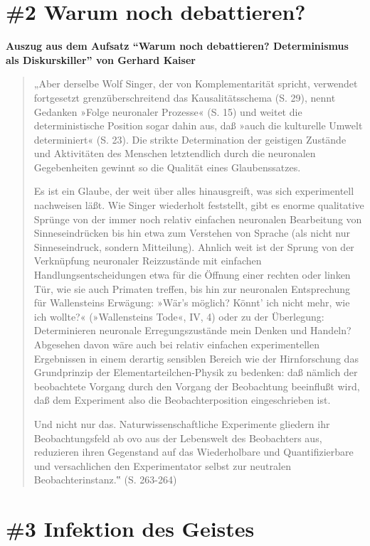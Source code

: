 \documentclass[
  a4paper,
]{report}
\begin{document}
\hypertarget{pr-ev2}{%
\section{\#2 Warum noch debattieren?}\label{pr-ev2}}

\textbf{Auszug aus dem Aufsatz ``Warum noch debattieren? Determinismus als Diskurskiller'' von Gerhard Kaiser \citeyearpar{Kaiser2004}}

\begin{quote}
„Aber derselbe Wolf Singer, der von Komplementarität spricht, verwendet fortgesetzt grenzüberschreitend das Kausalitätsschema (S. 29), nennt Gedanken »Folge neuronaler Prozesse« (S. 15) und weitet die deterministische Position sogar dahin aus, daß »auch die kulturelle Umwelt determiniert« (S. 23). Die strikte Determination der geistigen Zustände und Aktivitäten des Menschen letztendlich durch die neuronalen Gegebenheiten gewinnt so die Qualität eines Glaubenssatzes.

Es ist ein Glaube, der weit über alles hinausgreift, was sich experimentell nachweisen läßt. Wie Singer wiederholt feststellt, gibt es enorme qualitative Sprünge von der immer noch relativ einfachen neuronalen Bearbeitung von Sinneseindrücken bis hin etwa zum Verstehen von Sprache (als nicht nur Sinneseindruck, sondern Mitteilung). Ahnlich weit ist der Sprung von der Verknüpfung neuronaler Reizzustände mit einfachen Handlungsentscheidungen etwa für die Öffnung einer rechten oder linken Tür, wie sie auch Primaten treffen, bis hin zur neuronalen Entsprechung für Wallensteins Erwägung: »Wär's möglich? Könnt' ich nicht mehr, wie ich wollte?« (»Wallensteins Tode«, IV, 4) oder zu der Überlegung: Determinieren neuronale Erregungszustände mein Denken und Handeln? Abgesehen davon wäre auch bei relativ einfachen experimentellen Ergebnissen in einem derartig sensiblen Bereich wie der Hirnforschung das Grundprinzip der Elementarteilchen-Physik zu bedenken: daß nämlich der beobachtete Vorgang durch den Vorgang der Beobachtung beeinflußt wird, daß dem Experiment also die Beobachterposition eingeschrieben ist.

Und nicht nur das. Naturwissenschaftliche Experimente gliedern ihr Beobachtungsfeld ab ovo aus der Lebenswelt des Beobachters aus, reduzieren ihren Gegenstand auf das Wiederholbare und Quantifizierbare und versachlichen den Experimentator selbst zur neutralen Beobachterinstanz.‟ (S. 263-264)
\end{quote}

\hypertarget{pr-ev3}{%
\section{\#3 Infektion des Geistes}\label{pr-ev3}}
\end{document}

